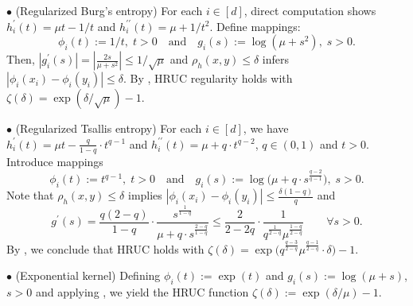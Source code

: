 \documentclass{article}
\theoremstyle{plain}
\theoremstyle{definition}
\theoremstyle{remark}
\begin{document}
\noindent $\bullet$ {(Regularized Burg's entropy)} For each $i\in[d]$, direct computation shows  $h_i^\prime(t)=\mu t-1/t$ and $h_i^{\prime\prime}(t)=\mu + 1/t^2$. Define mappings:
\[
\phi_i(t):=1/t,\; t>0 \quad \text{and} \quad g_i(s):=\log(\mu+s^2),\;s>0.
\]
Then, $|g_i^\prime(s)|=|\frac{2s}{\mu+s^2}| \leq 1/\sqrt{\mu}$ and $\rho_h(x,y)\leq \delta$ infers $|\phi_i(x_i)-\phi_i(y_i)|\leq\delta$. By , HRUC regularity holds with $\zeta(\delta)=\exp(\delta/\sqrt{\mu})-1$.\par\smallskip

\noindent $\bullet$ {(Regularized Tsallis entropy)} For each $i\in[d]$, we have $h_i^\prime(t)=\mu t- \frac{q}{1-q}\cdot t^{q-1}$ and $h_i^{\prime\prime}(t)=\mu + q \cdot  t^{q-2}$, $q\in(0,1)$ and $t>0$. Introduce mappings
\[
\phi_i(t):=t^{q-1},\;t>0 \quad \text{and} \quad g_i(s):=\log\big(\mu+q\cdot s^{\frac{q-2}{q-1}}\big),\;s>0.
\]
Note that $\rho_h(x,y)\leq \delta$ implies $|\phi_i(x_i)-\phi_i(y_i)| \leq \frac{\delta(1-q)}{q}$ and 
\[g^\prime(s)=\frac{q(2-q)}{1-q}\cdot \frac{s^{\frac{1}{1-q}}}{\mu + q\cdot s^{\frac{2-q}{1-q}}} \leq \frac{2}{2-2q}\cdot \frac{1}{q^{\frac{1}{2-q}}\mu^{\frac{1-q}{2-q}}} \qquad \forall s>0.\] 
By , we conclude that HRUC holds with $\zeta(\delta)= \exp\big(q^{\frac{q-3}{2-q}}\mu^{\frac{q-1}{2-q}}\cdot \delta \big)-1$.\par\smallskip
 
\noindent $\bullet$ {(Exponential kernel)} 
Defining $\phi_i(t):=\exp(t)$ and  $g_i(s):=\log(\mu+s)$, $s>0$ and applying %
, we yield the HRUC function $\zeta(\delta):=\exp(\delta/\mu)-1$.\par\smallskip
\end{document}
